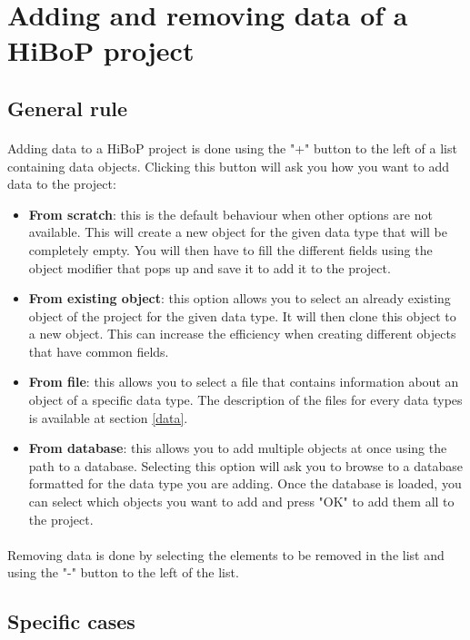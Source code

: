 \documentclass[a4paper]{article}
\begin{document}
\section{Adding and removing data of a HiBoP project}\label{addobjects}
\subsection{General rule}
\paragraph{} Adding data to a HiBoP project is done using the "+" button to the left of a list containing data objects. Clicking this button will ask you how you want to add data to the project:
\begin{itemize}
\item \textbf{From scratch}: this is the default behaviour when other options are not available. This will create a new object for the given data type that will be completely empty. You will then have to fill the different fields using the object modifier that pops up and save it to add it to the project.
\item \textbf{From existing object}: this option allows you to select an already existing object of the project for the given data type. It will then clone this object to a new object. This can increase the efficiency when creating different objects that have common fields.
\item \textbf{From file}: this allows you to select a file that contains information about an object of a specific data type. The description of the files for every data types is available at section \ref{data}.
\item \textbf{From database}: this allows you to add multiple objects at once using the path to a database. Selecting this option will ask you to browse to a database formatted for the data type you are adding. Once the database is loaded, you can select which objects you want to add and press "OK" to add them all to the project.
\end{itemize}
\paragraph{} Removing data is done by selecting the elements to be removed in the list and using the "-" button to the left of the list.
\subsection{Specific cases}
\end{document}
